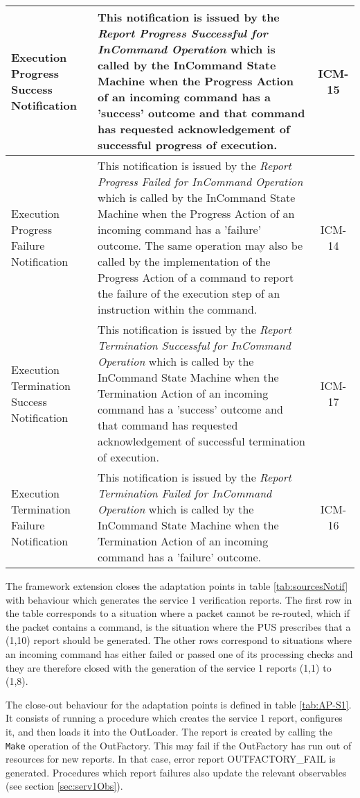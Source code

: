 \documentclass{pnp_article}
\begin{document}
\begin{longtable}{|>{\raggedright\arraybackslash}p{2.1cm}|>{\raggedright\arraybackslash}p{9.8cm}|c|}
\hline
Execution Progress Success Notification &  This notification is issued by the \textit{Report Progress Successful for InCommand Operation} which is called by the InCommand State Machine when the Progress Action of an incoming command has a 'success' outcome and that command has requested acknowledgement of successful progress of execution. & ICM-15 \\
\hline
Execution Progress Failure Notification &  This notification is issued by the \textit{Report Progress Failed for InCommand Operation} which is called by the InCommand State Machine when the Progress Action of an incoming command has a 'failure' outcome. The same operation may also be called by the implementation of the Progress Action of a command to report the failure of the execution step of an instruction within the command. & ICM-14 \\
\hline 
Execution Termination Success Notification &  This notification is issued by the  \textit{Report Termination Successful for InCommand Operation} which is called by the InCommand State Machine when the Termination Action of an incoming command has a 'success' outcome and that command has requested acknowledgement of successful termination of execution. & ICM-17 \\
\hline
Execution Termination Failure Notification &  This notification is issued by the \textit{Report Termination Failed for InCommand Operation} which is called by the InCommand State Machine when the Termination Action of an incoming command has a 'failure' outcome. & ICM-16 \\
\hline
\end{longtable} 

The framework extension closes the adaptation points in table \ref{tab:sourcesNotif} with behaviour which generates the service 1 verification reports. The first row in the table corresponds to a situation where a packet cannot be re-routed, which if the packet contains a command, is the situation where the PUS prescribes that a (1,10) report should be generated. The other rows correspond to situations where an incoming command has either failed or passed one of its processing checks and they are therefore closed with the generation of the service 1 reports (1,1) to (1,8). 

The close-out behaviour for the adaptation points is defined in table \ref{tab:AP-S1}. It consists of running a procedure which creates the service 1 report, configures it, and then loads it into the OutLoader. The report is created by calling the \texttt{Make} operation of the OutFactory. This may fail if the OutFactory has run out of resources for new reports. In that case, error report OUTFACTORY\_FAIL is generated. Procedures which report failures also update the relevant observables (see section \ref{sec:serv1Obs}).
\end{document}
